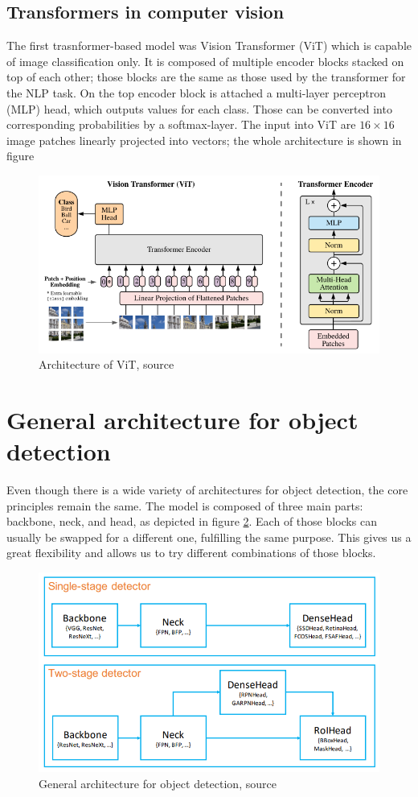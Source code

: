 \subsection{Transformers in computer vision}
The first trasnformer-based model was Vision Transformer (ViT) which is capable of image classification only. It is composed of multiple encoder blocks stacked on top of each other; those blocks are the same as those used by the transformer for the NLP task. On the top encoder block is attached a multi-layer perceptron (MLP) head, which outputs values for each class. Those can be converted into corresponding probabilities by a softmax-layer. The input into ViT are $16 \times 16$ image patches linearly projected into vectors; the whole architecture is shown in figure
\begin{figure}
    \centering
    \includegraphics[width=\linewidth]{images/vision_transformer.png}
    \caption{Architecture of ViT, source \cite{Dosovitskiy2020}}
    \label{fig:vision_transformer}
\end{figure}


\section{General architecture for object detection}
Even though there is a wide variety of architectures for object detection, the core principles remain the same. The model is composed of three main parts: backbone, neck, and head, as depicted in figure \ref{fig:object_detection_architecture}. Each of those blocks can usually be swapped for a different one, fulfilling the same purpose. This gives us a great flexibility and allows us to try different combinations of those blocks.


\begin{figure}
    \centering
    \includegraphics[width=0.6\linewidth]{images/object_detection_architecture.png}
    \caption{General architecture for object detection, source \cite{Chen2019}}
    \label{fig:object_detection_architecture}
\end{figure}

